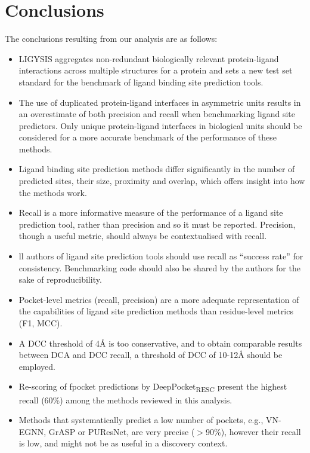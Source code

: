 \section{Conclusions}

The conclusions resulting from our analysis are as follows:

\begin{itemize}

\item LIGYSIS aggregates non-redundant biologically relevant protein-ligand interactions across multiple structures for a protein and sets a new test set standard for the benchmark of ligand binding site prediction tools. 

\item The use of duplicated protein-ligand interfaces in asymmetric units results in an overestimate of both precision and recall when benchmarking ligand site predictors. Only unique protein-ligand interfaces in biological units should be considered for a more accurate benchmark of the performance of these methods.

\item Ligand binding site prediction methods differ significantly in the number of predicted sites, their size, proximity and overlap, which offers insight into how the methods work.

\item Recall is a more informative measure of the performance of a ligand site prediction tool, rather than precision and so it must be reported. Precision, though a useful metric, should always be contextualised with recall.

\item ll authors of ligand site prediction tools should use recall as ``success rate'' for consistency. Benchmarking code should also be shared by the authors for the sake of reproducibility.

\item Pocket-level metrics (recall, precision) are a more adequate representation of the capabilities of ligand site prediction methods than residue-level metrics (F1, MCC).

\item A DCC threshold of 4\AA{} is too conservative, and to obtain comparable results between DCA and DCC recall, a threshold of DCC of 10-12\AA{} should be employed.

\item Re-scoring of fpocket predictions by DeepPocket\textsubscript{RESC} present the highest recall (60\%) among the methods reviewed in this analysis.

\item Methods that systematically predict a low number of pockets, e.g., VN-EGNN, GrASP or PUResNet, are very precise ($>$90\%), however their recall is low, and might not be as useful in a discovery context.

\end{itemize}
